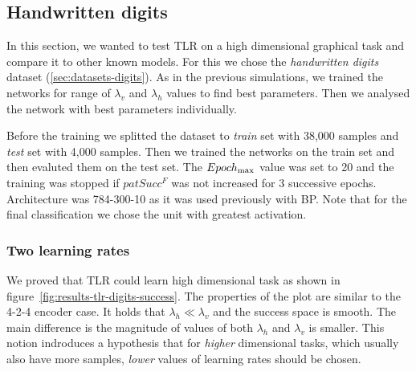 

\subsection{Handwritten digits} 
\label{sec:results-digits} 

In this section, we wanted to test TLR on a high dimensional graphical task and compare it to other known models. For this we chose the \emph{handwritten digits} dataset (\ref{sec:datasets-digits}). As in the previous simulations, we trained the networks for range of $\lambda_v$ and $\lambda_h$ values to find best parameters. Then we analysed the network with best parameters individually. 

Before the training we splitted the dataset to \emph{train} set with 38,000 samples and \emph{test} set with 4,000 samples. Then we trained the networks on the train set and then evaluted them on the test set. The $Epoch_{\rm max}$ value was set to 20 and the training was stopped if $patSucc^F$ was not increased for 3 successive epochs. Architecture was 784-300-10 as it was used previously with BP. Note that for the final classification we chose the unit with greatest activation. 

\subsubsection{Two learning rates} 
\label{sec:tlr-digits} 

We proved that TLR could learn high dimensional task as shown in figure~\ref{fig:results-tlr-digits-success}. The properties of the plot are similar to the 4-2-4 encoder case. It holds that $\lambda_h \ll \lambda_v$ and the success space is smooth. The main difference is the magnitude of values of both $\lambda_h$ and $\lambda_v$ is smaller. This notion indroduces a hypothesis that for \emph{higher} dimensional tasks, which usually also have more samples, \emph{lower} values of learning rates should be chosen. 

